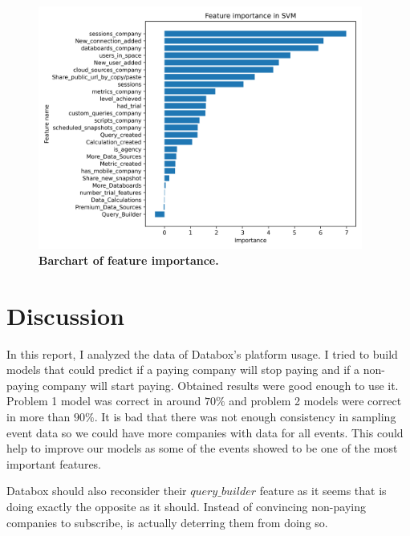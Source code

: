 \documentclass[fleqn,moreauthors,10pt]{ds_report}
\begin{document}
\begin{figure}[h]\centering
	\includegraphics[width=\linewidth, height=8cm]{SVM_feature_imp_all_data.png}
	
	\caption{\textbf{Barchart of feature importance.}}
	\label{feature_importance_2}
\end{figure}

\section*{Discussion}
In this report, I analyzed the data of Databox's platform usage. I tried to build models that could predict if a paying company will stop paying and if a non-paying company will start paying. Obtained results were good enough to use it. Problem 1 model was correct in around $70\%$ and problem 2 models were correct in more than $90\%$. It is bad that there was not enough consistency in sampling event data so we could have more companies with data for all events. This could help to improve our models as some of the events showed to be one of the most important features.


Databox should also reconsider their $query\_builder$ feature as it seems that is doing exactly the opposite as it should. Instead of convincing non-paying companies to subscribe, is actually deterring them from doing so. 
\end{document}
